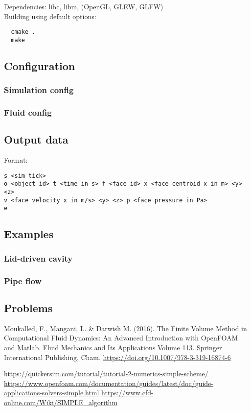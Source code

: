 \documentclass[12pt]{article}
\begin{document}
Dependencies: libc, libm, (OpenGL, GLEW, GLFW)\\

Building using default options:

\begin{verbatim}
  cmake .
  make
\end{verbatim}

\subsection{Configuration}

\subsubsection{Simulation config}

\subsubsection{Fluid config}

\subsection{Output data}

Format:

\begin{verbatim}
s <sim tick>
o <object id> t <time in s> f <face id> x <face centroid x in m> <y> <z> 
v <face velocity x in m/s> <y> <z> p <face pressure in Pa>
e
\end{verbatim}

\subsection{Examples}

\subsubsection{Lid-driven cavity}

\subsubsection{Pipe flow}

\subsection{Problems}

\begin{thebibliography}{9}
 Moukalled, F., Mangani, L. \& Darwish M. (2016). The Finite Volume Method in Computational Fluid Dynamics: An Advanced Introduction with OpenFOAM and Matlab. Fluid Mechanics and Its Applications Volume 113. Springer International Publishing, Cham. \url{https://doi.org/10.1007/978-3-319-16874-6}
  
 \url{https://quickersim.com/tutorial/tutorial-2-numerics-simple-scheme/}
 \url{https://www.openfoam.com/documentation/guides/latest/doc/guide-applications-solvers-simple.html}
 \url{https://www.cfd-online.com/Wiki/SIMPLE_algorithm}

\end{thebibliography}
\end{document}
